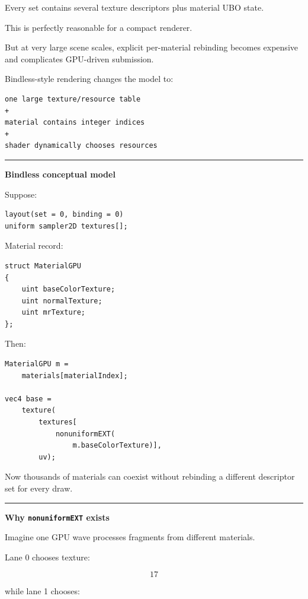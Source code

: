 Every set contains several texture descriptors plus material UBO state.

This is perfectly reasonable for a compact renderer.

But at very large scene scales, explicit per-material rebinding becomes expensive and complicates GPU-driven submission.

Bindless-style rendering changes the model to:

\begin{verbatim}
one large texture/resource table
+
material contains integer indices
+
shader dynamically chooses resources
\end{verbatim}

\begin{center}\rule{0.5\linewidth}{0.5pt}\end{center}

\textbf{Bindless conceptual model}

Suppose:

\begin{verbatim}
layout(set = 0, binding = 0)
uniform sampler2D textures[];
\end{verbatim}

Material record:

\begin{verbatim}
struct MaterialGPU
{
    uint baseColorTexture;
    uint normalTexture;
    uint mrTexture;
};
\end{verbatim}

Then:

\begin{verbatim}
MaterialGPU m =
    materials[materialIndex];

vec4 base =
    texture(
        textures[
            nonuniformEXT(
                m.baseColorTexture)],
        uv);
\end{verbatim}

Now thousands of materials can coexist without rebinding a different descriptor set for every draw.

\begin{center}\rule{0.5\linewidth}{0.5pt}\end{center}

\textbf{Why \texttt{nonuniformEXT} exists}

Imagine one GPU wave processes fragments from different materials.

Lane 0 chooses texture:

\[
17
\]

while lane 1 chooses:

